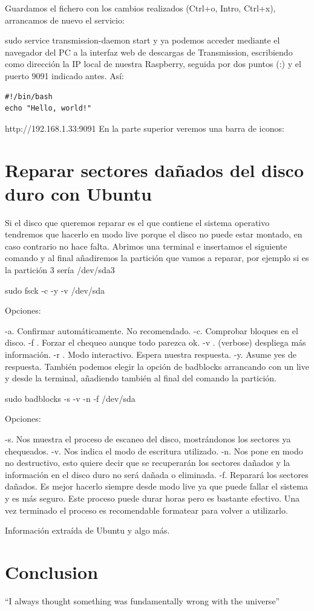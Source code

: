 \documentclass{article}
\begin{document}
Guardamos el fichero con los cambios realizados (Ctrl+o, Intro, Ctrl+x), arrancamos de nuevo el servicio:

sudo service transmission-daemon start
y ya podemos acceder mediante el navegador del PC a la interfaz web de descargas de Transmission, escribiendo como dirección la IP local de nuestra Raspberry, seguida por dos puntos (:) y el puerto 9091 indicado antes. Así:

\begin{verbatim}
#!/bin/bash
echo "Hello, world!"
\end{verbatim}

http://192.168.1.33:9091
En la parte superior veremos una barra de iconos:

\section{Reparar sectores dañados del disco duro con Ubuntu}

Si el disco que queremos reparar es el que contiene el sistema operativo tendremos que hacerlo en modo live porque el disco no puede estar montado, en caso contrario no hace falta. Abrimos una terminal e insertamos el siguiente comando y al final añadiremos la partición que vamos a reparar, por ejemplo si es la partición 3 sería /dev/sda3

sudo fsck -c -y -v /dev/sda

Opciones:

-a. Confirmar automáticamente. No recomendado.
-c. Comprobar bloques en el disco.
-f . Forzar el chequeo aunque todo parezca ok.
-v . (verbose) despliega más información.
-r . Modo interactivo. Espera nuestra respuesta.
-y. Asume yes de respuesta.
También podemos elegir la opción de badblocks arrancando con un live y desde la terminal, añadiendo también al final del comando la partición.

sudo badblocks -s -v -n -f /dev/sda

Opciones:

-s. Nos muestra el proceso de escaneo del disco, mostrándonos los sectores ya chequeados.
-v. Nos indica el modo de escritura utilizado.
-n. Nos pone en modo no destructivo, esto quiere decir que se recuperarán los sectores dañados y la información en el disco duro no será dañada o eliminada.
-f. Reparará los sectores dañados.
Es mejor hacerlo siempre desde modo live ya que puede fallar el sistema y es más seguro. Este proceso puede durar horas pero es bastante efectivo. Una vez terminado el proceso es recomendable formatear para volver a utilizarlo.

Información extraída de Ubuntu y algo más.

\section{Conclusion}
``I always thought something was fundamentally wrong with the universe'' \citep{adams1995hitchhiker}



\end{document}
